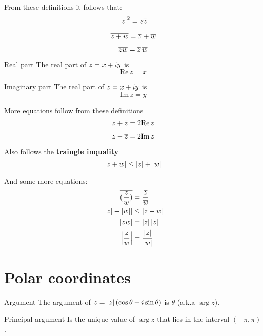 \documentclass{amsbook}
\begin{document}
From these definitions it follows that:
\begin{equation}
\left| z \right|^2 = z \overline z
\end{equation}

\begin{equation}
\overline{z + w} = \overline z + \overline w
\label{eq:}
\end{equation}

\begin{equation}
\overline{zw} = \overline z \,  \overline w
\label{eq:}
\end{equation}
\newcommand{\realpart} {\mbox{Re}\,}
\begin{mydef}{Real part}
The real part of $z = x + iy$ is 
\begin{equation}
\realpart z = x
\end{equation}
\end{mydef}

\newcommand{\impart} {\mbox{Im}\,}
\begin{mydef}{Imaginary part}
The real part of $z = x + iy$ is 
\begin{equation}
\impart z = y
\end{equation}
\end{mydef}

More equations follow from these definitions
\begin{equation}
z + \conjugate z = 2 \realpart z 
\end{equation}

\begin{equation}
z - \conjugate z = 2 \impart z 
\end{equation}

Also follows the {\bf traingle inquality}
\begin{equation}
\left| z + w \right| \leq \left| z \right| + \left| w \right|
\end{equation}

And some more equations:
\begin{align}
\overline{(\frac{z}{w})} &= \frac{\overline{z}} {\overline{w}} \\
\left| \left| z \right| - \left| w \right| \right| &\leq \left| z - w \right| \\
\left| zw \right| & = \left| z \right| \left| z \right| \\
\left| \frac z w \right| &= \frac {\left| z \right|} {\left| w \right|}
\end{align}

\section{Polar coordinates}
\begin{mydef}{Argument}
The argument of $z = \left| z \right| (\cos\theta + i\sin\theta)$ is $\theta$ (a.k.a $\arg z$).  
\end{mydef}
\begin{mydef}{Principal argument}
Is the unique value of $\arg z$ that lies in the interval	 $(-\pi,\pi)$.  
\end{mydef}
\end{document}
